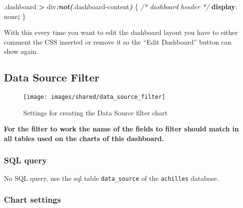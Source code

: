 \documentclass[
]{book}
\newenvironment{Shaded}{\begin{snugshade}}{\end{snugshade}}
\newcommand{\CommentTok}[1]{\textcolor[rgb]{0.56,0.35,0.01}{\textit{#1}}}
\newcommand{\DecValTok}[1]{\textcolor[rgb]{0.00,0.00,0.81}{#1}}
\newcommand{\FunctionTok}[1]{\textcolor[rgb]{0.00,0.00,0.00}{#1}}
\newcommand{\InformationTok}[1]{\textcolor[rgb]{0.56,0.35,0.01}{\textbf{\textit{#1}}}}
\newcommand{\KeywordTok}[1]{\textcolor[rgb]{0.13,0.29,0.53}{\textbf{#1}}}
\newcommand{\NormalTok}[1]{#1}
\newcommand{\OperatorTok}[1]{\textcolor[rgb]{0.81,0.36,0.00}{\textbf{#1}}}
\begin{document}
\begin{Shaded}
\begin{Highlighting}[]
\FunctionTok{.dashboard} \OperatorTok{\textgreater{}}\NormalTok{ div}\InformationTok{:not(}\FunctionTok{.dashboard{-}content}\InformationTok{)}\NormalTok{ \{  }\CommentTok{/* dashboard header */}
  \KeywordTok{display}\NormalTok{: }\DecValTok{none}\OperatorTok{;}
\NormalTok{\}}
\end{Highlighting}
\end{Shaded}

With this every time you want to edit the dashboard layout you have to either comment the CSS inserted
or remove it so the ``Edit Dashboard'' button can show again.

\hypertarget{data-source-filter}{%
\subsection*{Data Source Filter}\label{data-source-filter}}

\begin{figure}
\texttt{[image: images/shared/data\_source\_filter]} \caption{Settings for creating the Data Source filter chart}\label{fig:dataSourceFilter}
\end{figure}

\textbf{For the filter to work the name of the fields to filter should match in all tables used on the charts of this dashboard.}

\hypertarget{sql-query}{%
\subsubsection*{SQL query}\label{sql-query}}

No SQL query, use the sql table \texttt{data\_source} of the \texttt{achilles} database.

\hypertarget{chart-settings}{%
\subsubsection*{Chart settings}\label{chart-settings}}
\end{document}
